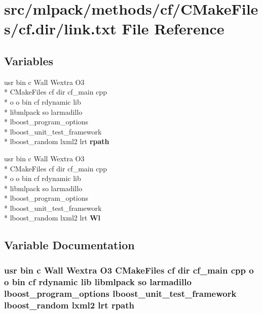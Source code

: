 \section{src/mlpack/methods/cf/\-C\-Make\-Files/cf.dir/link.txt File Reference}
\label{methods_2cf_2CMakeFiles_2cf_8dir_2link_8txt}
\subsection*{Variables}
\begin{DoxyCompactItemize}
\item 
usr bin c Wall Wextra O3 \\*
C\-Make\-Files cf dir cf\-\_\-main cpp \\*
o o bin cf rdynamic lib \\*
libmlpack so larmadillo \\*
lboost\-\_\-program\-\_\-options \\*
lboost\-\_\-unit\-\_\-test\-\_\-framework \\*
lboost\-\_\-random lxml2 lrt {\bf rpath}
\item 
usr bin c Wall Wextra O3 \\*
C\-Make\-Files cf dir cf\-\_\-main cpp \\*
o o bin cf rdynamic lib \\*
libmlpack so larmadillo \\*
lboost\-\_\-program\-\_\-options \\*
lboost\-\_\-unit\-\_\-test\-\_\-framework \\*
lboost\-\_\-random lxml2 lrt {\bf Wl}
\end{DoxyCompactItemize}


\subsection{Variable Documentation}
\subsubsection[{rpath}]{\setlength{\rightskip}{0pt plus 5cm}usr bin c Wall Wextra O3 C\-Make\-Files cf dir cf\-\_\-main cpp o o bin cf rdynamic lib libmlpack so larmadillo lboost\-\_\-program\-\_\-options lboost\-\_\-unit\-\_\-test\-\_\-framework lboost\-\_\-random lxml2 lrt rpath}\label{methods_2cf_2CMakeFiles_2cf_8dir_2link_8txt_a6e43f76583e7d720d1794b4fb4e19f5b}


